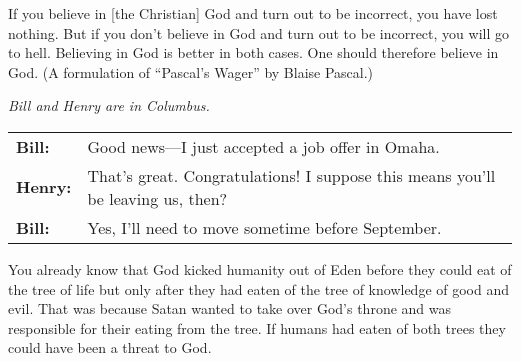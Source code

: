 {\begin{exercises}
\item If you believe in [the Christian] God and turn out to be incorrect, you have lost nothing. But if you don't believe in God and turn out to be incorrect, you will go to hell. Believing in God is better in both cases. One should therefore believe in God. (A formulation of ``Pascal's Wager'' by Blaise Pascal.) 

\item \textit{Bill and Henry are in Columbus.}
\vspace{-8pt}
\begin{adjustwidth}{2em}{0em}
\begin{longtabu}{p{.1\linewidth}p{.8\linewidth}}
\textbf{Bill:} & Good news---I just accepted a job offer in Omaha. \\
\textbf{Henry:} & That's great. Congratulations! I suppose this means you'll be leaving us, then?\\
\textbf{Bill:} & Yes, I'll need to move sometime before September.  \\
\end{longtabu}
\end{adjustwidth}
\vspace{-.9cm}

\item You already know that God kicked humanity out of Eden before they could eat of the tree of life but only after they had eaten of the tree of knowledge of good and evil. That was because Satan wanted to take over God's throne and was responsible for their eating from the tree. If humans had eaten of both trees they could have been a threat to God. 

\end{exercises}
}




